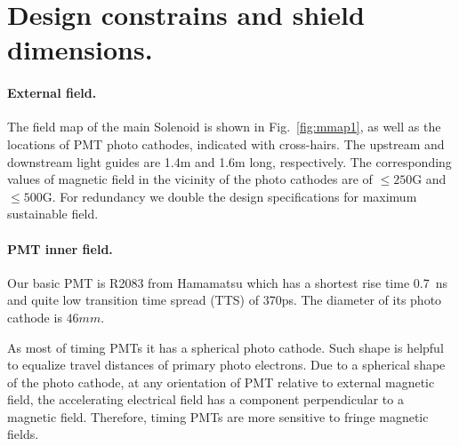\documentclass[12pt]{article}
\begin{document}
\section{Design constrains and shield dimensions.}

\paragraph{External field.}
The  field map of the main Solenoid is shown in  Fig.~\ref{fig:mmap1}, as well as  the 
locations of PMT photo cathodes, indicated with cross-hairs.
The   upstream and downstream light guides  are  1.4m and 1.6m long, respectively.   
The corresponding values of magnetic  field in the vicinity of the photo cathodes  
are of $\leq 250$G and $\leq 500$G. 
For  redundancy  we double the design specifications for  maximum sustainable    field.
\paragraph{PMT inner field.}
Our basic  PMT is  R2083 from Hamamatsu which
has a  shortest rise time 0.7~ns  and   quite low transition time spread (TTS) of 370ps.
The diameter of its  photo cathode  is $46mm$. 

As most of timing PMTs it has a spherical photo cathode. 
Such shape is helpful to  equalize travel  distances of primary photo electrons. 
Due to a spherical shape of the photo cathode, at any orientation of PMT relative to external
magnetic field, the accelerating  electrical field has  a  component perpendicular to  a magnetic field.
Therefore, timing PMTs  are more  sensitive to fringe  magnetic fields.
\end{document}
